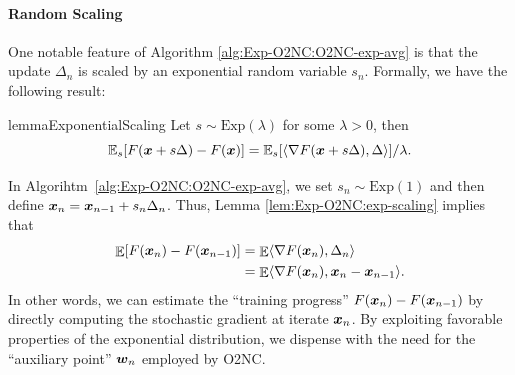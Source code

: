 \paragraph{Random Scaling}

One notable feature of Algorithm \ref{alg:Exp-O2NC:O2NC-exp-avg} is that the update $\Delta_n$ is scaled by an exponential random variable $s_n$. 
Formally, we have the following result:

\begin{restatable}{lemma}{ExponentialScaling}
\label{lem:Exp-O2NC:exp-scaling}
Let $s\sim\mathrm{Exp}(\lambda)$ for some $\lambda>0$, then
\begin{equation*}
    \mathbb{E}_s[F({\boldsymbol{x}}+s\Delta) - F({\boldsymbol{x}})] = \mathbb{E}_s[\langle \nabla F({\boldsymbol{x}}+s\Delta), \Delta\rangle] / \lambda.
\end{equation*}
\end{restatable}

In Algorihtm~\ref{alg:Exp-O2NC:O2NC-exp-avg}, we set $s_n\sim\mathrm{Exp}(1)$ and then define ${\boldsymbol{x}}_n = {\boldsymbol{x}}_{n-1} + s_n\Delta_n$. Thus, Lemma \ref{lem:Exp-O2NC:exp-scaling} implies that 
\begin{align*}
    \mathop{\mathbb{E}}[F({\boldsymbol{x}}_n) - F({\boldsymbol{x}}_{n-1})] 
    &= \mathop{\mathbb{E}}\langle \nabla F({\boldsymbol{x}}_n), \Delta_n\rangle \\
    &= \mathop{\mathbb{E}}\langle \nabla F({\boldsymbol{x}}_n), {\boldsymbol{x}}_n-{\boldsymbol{x}}_{n-1}\rangle.
\end{align*}
In other words, we can estimate the ``training progress'' $F({\boldsymbol{x}}_n)-F({\boldsymbol{x}}_{n-1})$ by directly computing the stochastic gradient at iterate ${\boldsymbol{x}}_n$. By exploiting favorable properties of the exponential distribution, we dispense with the need for the ``auxiliary point'' ${\boldsymbol{w}}_n $ employed by O2NC.

